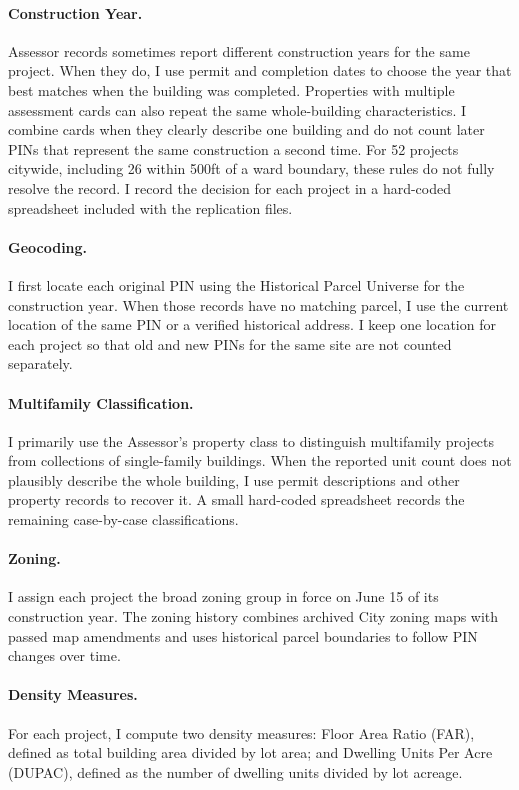 \paragraph{Construction Year.}
Assessor records sometimes report different construction years for the same project.
When they do, I use permit and completion dates to choose the year that best matches when the building was completed.
Properties with multiple assessment cards can also repeat the same whole-building characteristics.
I combine cards when they clearly describe one building and do not count later PINs that represent the same construction a second time.
For 52 projects citywide, including 26 within 500ft of a ward boundary, these rules do not fully resolve the record.
I record the decision for each project in a hard-coded spreadsheet included with the replication files.

\paragraph{Geocoding.}
I first locate each original PIN using the Historical Parcel Universe for the construction year.
When those records have no matching parcel, I use the current location of the same PIN or a verified historical address.
I keep one location for each project so that old and new PINs for the same site are not counted separately.

\paragraph{Multifamily Classification.}
I primarily use the Assessor's property class to distinguish multifamily projects from collections of single-family buildings.
When the reported unit count does not plausibly describe the whole building, I use permit descriptions and other property records to recover it.
A small hard-coded spreadsheet records the remaining case-by-case classifications.

\paragraph{Zoning.}
I assign each project the broad zoning group in force on June 15 of its construction year.
The zoning history combines archived City zoning maps with passed map amendments and uses historical parcel boundaries to follow PIN changes over time.

\paragraph{Density Measures.}
For each project, I compute two density measures: Floor Area Ratio (FAR), defined as total building area divided by lot area; and Dwelling Units Per Acre (DUPAC), defined as the number of dwelling units divided by lot acreage.

